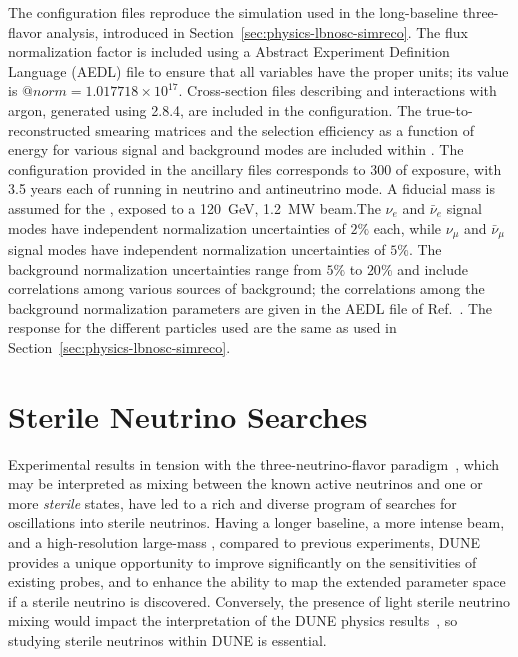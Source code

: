 The   configuration files reproduce the  simulation used in the long-baseline three-flavor analysis, introduced in Section~\ref{sec:physics-lbnosc-simreco}.
The flux normalization factor is included using a  Abstract Experiment Definition Language (AEDL) 
file to ensure that all variables have the proper units; its value is $@norm = 1.017718\times 10^{17}$.  Cross-section files describing  and  interactions with argon, generated using  2.8.4, are included in the configuration. The true-to-reconstructed smearing matrices and the selection efficiency as a function of energy for various signal and background modes are included within . The   configuration provided in the ancillary files corresponds to \SI{300}{\ktMWyr} of exposure, with 3.5 years each of running in neutrino and antineutrino mode. A \fdfiducialmass fiducial mass is assumed for the , exposed to a \SI{120}{GeV}, \SI{1.2}{MW} beam.The $\nu_{e}$ and $\bar\nu_{e}$ signal modes have independent normalization uncertainties of $2\%$ each, while $\nu_{\mu}$ and $\bar{\nu}_{\mu}$ signal modes have independent normalization uncertainties of $5\%$. The background normalization uncertainties range from $5\%$ to $20\%$ and include
correlations among various sources of background; the correlations among the background normalization parameters are given in the AEDL file of Ref.~\cite{Alion:2016uaj}. The  response for the different particles used are the same as used in Section~\ref{sec:physics-lbnosc-simreco}.



\section{Sterile Neutrino Searches}
Experimental results in tension with the three-neutrino-flavor paradigm~\cite{LSNDSterile,MiniBooNESterile,GalliumSummary,ReactorSummary, ref:tension,Gariazzo:2017fdh}, which may be interpreted as mixing between the known active neutrinos and one or more \textit{sterile} states, have led to a rich and diverse program of searches for oscillations into sterile neutrinos. Having a longer baseline, a more intense beam, and a high-resolution large-mass , %
compared to previous experiments, DUNE provides a unique opportunity to improve significantly on the sensitivities of existing probes, and to enhance the ability to map the extended parameter space if a sterile neutrino is discovered. Conversely, the presence of light sterile neutrino mixing would impact the interpretation of the DUNE physics results~\cite{Dutta:2016glq}, so studying sterile neutrinos within DUNE is essential.
	
